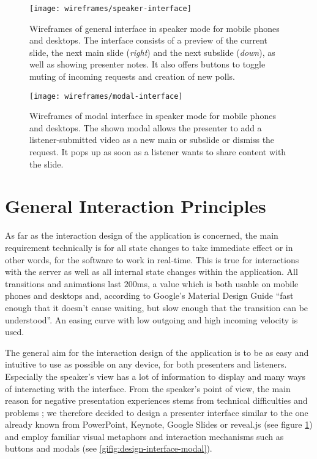 \begin{figure}
\centering
\texttt{[image: wireframes/speaker-interface]}
\caption{Wireframes of general interface in speaker mode for mobile phones and desktops. The interface consists of a preview of the current slide, the next main slide (\emph{right}) and the next subslide (\emph{down}), as well as showing presenter notes. It also offers buttons to toggle muting of incoming requests and creation of new polls.}
\label{fig:design-interface-presenter}
\end{figure}

\begin{figure}
\centering
\texttt{[image: wireframes/modal-interface]}
\caption{Wireframes of modal interface in speaker mode for mobile phones and desktops. The shown modal allows the presenter to add a listener-submitted video as a new main or subslide or dismiss the request. It pops up as soon as a listener wants to share content with the slide.}
\label{fig:design-interface-modal}
\end{figure}

\section{General Interaction Principles}
As far as the interaction design of the application is concerned, the main requirement technically is for all state changes to take immediate effect or in other words, for the software to work in real-time. This is true for interactions with the server as well as all internal state changes within the application. All transitions and animations last $200$ms, a value which is both usable on mobile phones and desktops and, according to Google's Material Design Guide \cite{GoogleMaterialDesignGuide} ``fast enough that it doesn't cause waiting, but slow enough that the transition can be understood''. An easing curve with low outgoing and high incoming velocity is used.

The general aim for the interaction design of the application is to be as easy and intuitive to use as possible on any device, for both presenters and listeners. Especially the speaker's view has a lot of information to display and many ways of interacting with the interface. From the speaker's point of view, the main reason for negative presentation experiences stems from technical difficulties and problems \cite{Wacker:PresenterExperience}; we therefore decided to design a presenter interface similar to the one already known from PowerPoint, Keynote, Google Slides or reveal.js (see figure \ref{fig:design-interface-presenter}) and employ familiar visual metaphors and interaction mechanisms such as buttons and modals (see \ref{gifig:design-interface-modal}).

